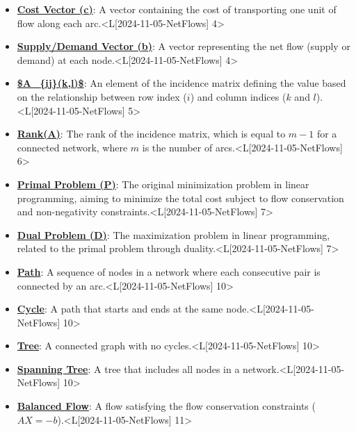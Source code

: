 \documentclass{article}%
\begin{document}
\begin{itemize}[[leftmargin=*]]
\item \href{https://www.math.purdue.edu/~yipn/421/2024-11-05-NetFlows.pdf#page=4}{\textbf{Cost Vector (c)}}: A vector containing the cost of transporting one unit of flow along each arc.<L[2024-11-05-NetFlows] 4>%
\item \href{https://www.math.purdue.edu/~yipn/421/2024-11-05-NetFlows.pdf#page=4}{\textbf{Supply/Demand Vector (b)}}: A vector representing the net flow (supply or demand) at each node.<L[2024-11-05-NetFlows] 4>%
\item \href{https://www.math.purdue.edu/~yipn/421/2024-11-05-NetFlows.pdf#page=5}{\textbf{\$A\_\{ij\}(k,l)\$}}: An element of the incidence matrix defining the value based on the relationship between row index ($i$) and column indices ($k$ and $l$).<L[2024-11-05-NetFlows] 5>%
\item \href{https://www.math.purdue.edu/~yipn/421/2024-11-05-NetFlows.pdf#page=6}{\textbf{Rank(A)}}: The rank of the incidence matrix, which is equal to $m-1$ for a connected network, where $m$ is the number of arcs.<L[2024-11-05-NetFlows] 6>%
\item \href{https://www.math.purdue.edu/~yipn/421/2024-11-05-NetFlows.pdf#page=7}{\textbf{Primal Problem (P)}}: The original minimization problem in linear programming, aiming to minimize the total cost subject to flow conservation and non-negativity constraints.<L[2024-11-05-NetFlows] 7>%
\item \href{https://www.math.purdue.edu/~yipn/421/2024-11-05-NetFlows.pdf#page=7}{\textbf{Dual Problem (D)}}: The maximization problem in linear programming, related to the primal problem through duality.<L[2024-11-05-NetFlows] 7>%
\item \href{https://www.math.purdue.edu/~yipn/421/2024-11-05-NetFlows.pdf#page=10}{\textbf{Path}}: A sequence of nodes in a network where each consecutive pair is connected by an arc.<L[2024-11-05-NetFlows] 10>%
\item \href{https://www.math.purdue.edu/~yipn/421/2024-11-05-NetFlows.pdf#page=10}{\textbf{Cycle}}: A path that starts and ends at the same node.<L[2024-11-05-NetFlows] 10>%
\item \href{https://www.math.purdue.edu/~yipn/421/2024-11-05-NetFlows.pdf#page=10}{\textbf{Tree}}: A connected graph with no cycles.<L[2024-11-05-NetFlows] 10>%
\item \href{https://www.math.purdue.edu/~yipn/421/2024-11-05-NetFlows.pdf#page=10}{\textbf{Spanning Tree}}: A tree that includes all nodes in a network.<L[2024-11-05-NetFlows] 10>%
\item \href{https://www.math.purdue.edu/~yipn/421/2024-11-05-NetFlows.pdf#page=11}{\textbf{Balanced Flow}}: A flow satisfying the flow conservation constraints ($AX = -b$).<L[2024-11-05-NetFlows] 11>%

\end{itemize}
\end{document}
